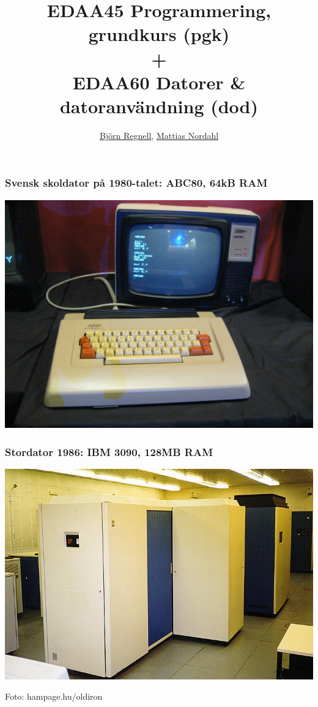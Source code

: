 \documentclass{lecturesimple}
\title[Kort presentation av pgk \& dod, \DateOfShow]{\textbf{EDAA45} Programmering, grundkurs (pgk) \\ + \\ \textbf{EDAA60} Datorer \& datoranvändning (dod)}
\author{\href{http://cs.lth.se/bjorn-regnell}{Björn Regnell}, \href{https://cs.lth.se/nordahl-mattias/}{Mattias Nordahl}}
\institute{\href{http://cs.lth.se}{Datavetenskap}, LTH}
\date{\DateOfShow}
\begin{document}
\frame{\titlepage}

\begin{frame}\frametitle{Svensk skoldator på 1980-talet: ABC80, 64kB RAM}
  \begin{center}
       \includegraphics[width=1.0\textwidth]{../img/abc80}
  \end{center}
  \end{frame}
  
  
  \begin{frame}\frametitle{Stordator 1986: IBM 3090, %
     128MB RAM}
  \begin{center}
       \includegraphics[width=1.0\textwidth]{../img/ibm3090.jpg}
    
      {\fontsize{5}{5}\selectfont\color{gray}
      Foto: hampage.hu/oldiron
    }
  \end{center}
  \end{frame}
    
\end{document}

